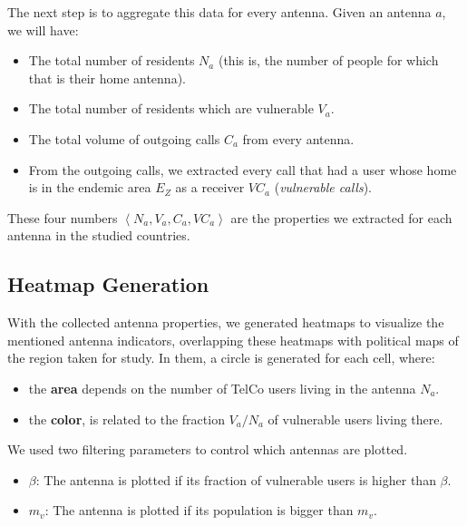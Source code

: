 The next step is to aggregate this data for every antenna.
Given an antenna $a$, we will have:
\begin{itemize}
	\item The total number of residents $N_a$ (this is, the number of people for which that is their home antenna).
	\item The total number of residents which are vulnerable $V_a$.
	\item The total volume of outgoing calls $C_a$ from every antenna.
	\item From the outgoing calls, we extracted every call that had a user whose home is in the endemic area $E_Z$ as a receiver $VC_a$ (\textit{vulnerable calls}).
\end{itemize}

These four numbers $\left< N_a, V_a, C_a, VC_a \right>$ are the properties we extracted for each antenna in the studied countries.


\subsection{Heatmap Generation}
With the collected antenna properties, we generated heatmaps to visualize the mentioned antenna indicators, overlapping these heatmaps with political maps of the region taken for study.
In them, a circle is generated for each cell, where:

\begin{itemize}
	\item the \textbf{area} depends on the number of TelCo users living in the antenna $N_a$.

	\item the \textbf{color}, is related to the fraction ${V_a}/{N_a}$ of vulnerable users living there.
\end{itemize}

%

We used two filtering parameters to control which antennas are plotted.
\begin{itemize}
	\item $\beta$: The antenna is plotted if its fraction of vulnerable users is higher than $\beta$.
	\item $m_v$: The antenna is plotted if its population is bigger than $m_v$.
\end{itemize}

